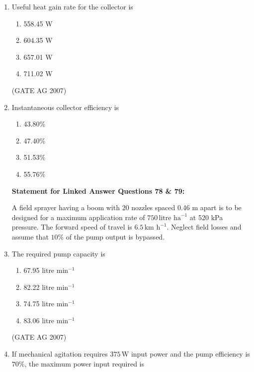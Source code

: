 \documentclass[journal,12pt,onecolumn]{IEEEtran}
\theoremstyle{remark}
\begin{document}
\begin{enumerate}
\item Useful heat gain rate for the collector is
\begin{multicols}{4}
\begin{enumerate}
\item 558.45 W
\item 604.35 W
\item 657.01 W
\item 711.02 W
\end{enumerate}
\end{multicols}
\hfill(GATE AG 2007)

\item Instantaneous collector efficiency is
\begin{multicols}{4}
\begin{enumerate}
\item 43.80\%
\item 47.40\%
\item 51.53\%
\item 55.76\%
\end{enumerate}
\end{multicols}

\textbf{Statement for Linked Answer Questions 78 \& 79:}



A field sprayer having a boom with 20 nozzles spaced 0.46 m apart is to be designed for a maximum application rate of $750 \, \text{litre ha}^{-1}$ at 520 kPa pressure. The forward speed of travel is $6.5 \, \text{km h}^{-1}$. Neglect field losses and assume that $10\%$ of the pump output is bypassed.



\item The required pump capacity is

\begin{multicols}{2}
\begin{enumerate}
\item 67.95 litre min$^{-1}$
\item 82.22 litre min$^{-1}$
\item 74.75 litre min$^{-1}$
\item 83.06 litre min$^{-1}$
\end{enumerate}
\end{multicols}
\hfill(GATE AG 2007)

\item If mechanical agitation requires $375 \, \text{W}$ input power and the pump efficiency is $70\%$, the maximum power input required is


\end{enumerate}
\end{document}
